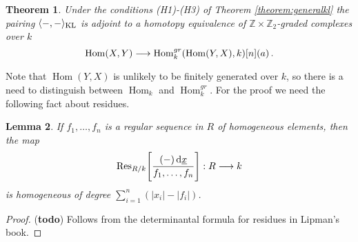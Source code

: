 \documentclass{compositio}
\newtheorem{theorem}{Theorem}[section]
\newtheorem{lemma}[theorem]{Lemma}
\theoremstyle{definition}
\numberwithin{equation}{section}
\newcommand{\Ress}[1]{\res_{#1}\!}
\def\res{\operatorname{Res}}
\def\Hom{\operatorname{Hom}}
\begin{document}
\begin{theorem}\label{theorem:generalklgraded} Under the conditions (H1)-(H3) of Theorem \ref{theorem:generalkl} the pairing $\langle -, - \rangle_{\textup{KL}}$ is adjoint to a homotopy equivalence of $\mathbb{Z} \times \mathbb{Z}_2$-graded complexes over $k$
\[
\Hom(X,Y) \lto \Hom^{gr}_k( \Hom(Y,X), k )[n](a)\,.
\]
\end{theorem}

Note that $\Hom(Y,X)$ is unlikely to be finitely generated over $k$, so there is a need to distinguish between $\Hom_k$ and $\Hom_k^{gr}$. For the proof we need the following fact about residues.

\begin{lemma}\label{lemma:residuesarehomog} If $f_1,\ldots,f_n$ is a regular sequence in $R$ of homogeneous elements, then the map
\[
\Ress{R/k}\Bigg[ \frac{(-) \, \ud \underline{x}}{ f_1, \ldots, f_n} \Bigg]: R \lto k
\]
is homogeneous of degree $\sum_{i=1}^n( |x_i| - |f_i| )$.
\end{lemma}
\begin{proof}
(\textbf{todo}) Follows from the determinantal formula for residues in Lipman's book.
\end{proof}
\end{document}
